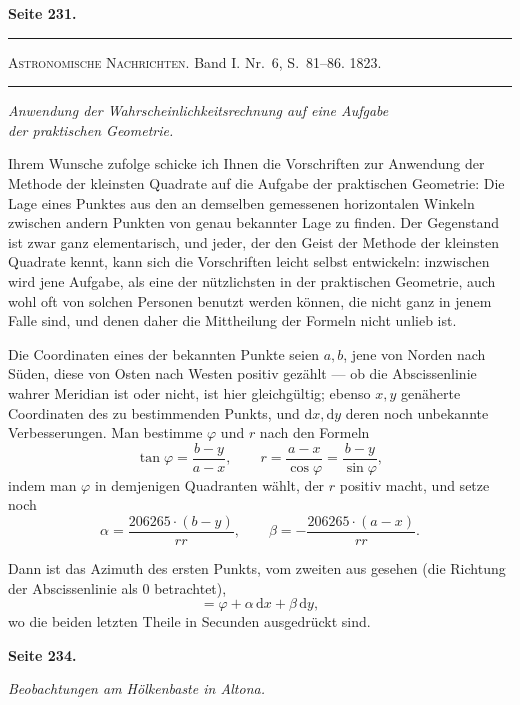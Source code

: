 \documentclass[12pt,a4paper]{article}
\newcommand{\tang}{\tan}
\theoremstyle{plain}
\theoremstyle{definition}
\theoremstyle{remark}
\begin{document}
\newpage
\textbf{Seite 231.}\quad [6.]

\begin{center}
\rule{6cm}{0.4pt}

\smallskip
\footnotesize
\textsc{Astronomische Nachrichten.} Band I. Nr.~6, S.~81--86. 1823.

\smallskip
\rule{6cm}{0.4pt}
\end{center}

\begin{center}
\emph{Anwendung der Wahrscheinlichkeitsrechnung auf eine Aufgabe\\der praktischen Geometrie.}
\end{center}

Ihrem Wunsche zufolge schicke ich Ihnen die Vorschriften zur Anwendung der Methode der kleinsten Quadrate auf die Aufgabe der praktischen Geometrie: Die Lage eines Punktes aus den an demselben gemessenen horizontalen Winkeln zwischen andern Punkten von genau bekannter Lage zu finden. Der Gegenstand ist zwar ganz elementarisch, und jeder, der den Geist der Methode der kleinsten Quadrate kennt, kann sich die Vorschriften leicht selbst entwickeln: inzwischen wird jene Aufgabe, als eine der nützlichsten in der praktischen Geometrie, auch wohl oft von solchen Personen benutzt werden können, die nicht ganz in jenem Falle sind, und denen daher die Mittheilung der Formeln nicht unlieb ist.

Die Coordinaten eines der bekannten Punkte seien $a, b$, jene von Norden nach Süden, diese von Osten nach Westen positiv gezählt --- ob die Abscissenlinie wahrer Meridian ist oder nicht, ist hier gleichgültig; ebenso $x, y$ genäherte Coordinaten des zu bestimmenden Punkts, und $\mathrm{d}x, \mathrm{d}y$ deren noch unbekannte Verbesserungen. Man bestimme $\varphi$ und $r$ nach den Formeln
\[
\tang \varphi = \frac{b - y}{a - x}, \qquad r = \frac{a - x}{\cos \varphi} = \frac{b - y}{\sin \varphi},
\]
indem man $\varphi$ in demjenigen Quadranten wählt, der $r$ positiv macht, und setze noch
\[
\alpha = \frac{206265 \cdot (b - y)}{rr}, \qquad \beta = -\frac{206265 \cdot (a - x)}{rr}.
\]

Dann ist das Azimuth des ersten Punkts, vom zweiten aus gesehen (die Richtung der Abscissenlinie als 0 betrachtet),
\[
= \varphi + \alpha \, \mathrm{d}x + \beta \, \mathrm{d}y,
\]
wo die beiden letzten Theile in Secunden ausgedrückt sind.

\newpage
\textbf{Seite 234.}

\begin{center}
\emph{Beobachtungen am Hölkenbaste in Altona.}
\end{center}
\end{document}
